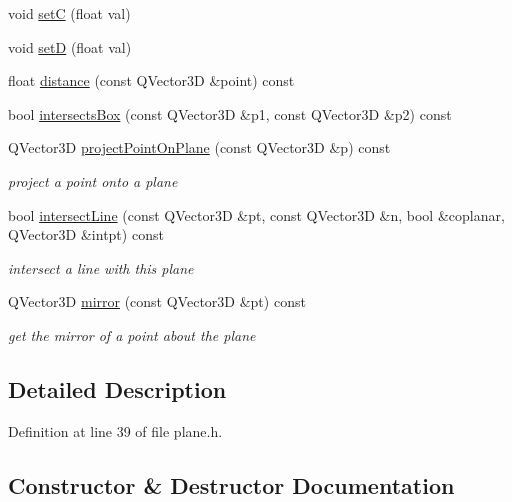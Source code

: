 \begin{DoxyCompactItemize}
void \hyperlink{classShipCAD_1_1Plane_affed6efd889f4725ae764b243763fb3e}{setC} (float val)
\item 
void \hyperlink{classShipCAD_1_1Plane_a5c3e18bcb1bb77563fd994866ba823df}{setD} (float val)
\item 
float \hyperlink{classShipCAD_1_1Plane_a6851b997a300848fcb37b33407165c44}{distance} (const Q\+Vector3D \&point) const 
\item 
bool \hyperlink{classShipCAD_1_1Plane_a76d5f22d213962e8ab0880fae3e919df}{intersects\+Box} (const Q\+Vector3D \&p1, const Q\+Vector3D \&p2) const 
\item 
Q\+Vector3D \hyperlink{classShipCAD_1_1Plane_a2ef81e9310257ad80b087181f3191b4a}{project\+Point\+On\+Plane} (const Q\+Vector3D \&p) const 
\begin{DoxyCompactList}\small\item\em project a point onto a plane \end{DoxyCompactList}\item 
bool \hyperlink{classShipCAD_1_1Plane_a8f6c0ea64a798798ee098658cd38935b}{intersect\+Line} (const Q\+Vector3D \&pt, const Q\+Vector3D \&n, bool \&coplanar, Q\+Vector3D \&intpt) const 
\begin{DoxyCompactList}\small\item\em intersect a line with this plane \end{DoxyCompactList}\item 
Q\+Vector3D \hyperlink{classShipCAD_1_1Plane_a77073798d61488aeac1ebe95358e3b98}{mirror} (const Q\+Vector3D \&pt) const 
\begin{DoxyCompactList}\small\item\em get the mirror of a point about the plane \end{DoxyCompactList}\end{DoxyCompactItemize}


\subsection{Detailed Description}


Definition at line 39 of file plane.\+h.



\subsection{Constructor \& Destructor Documentation}
